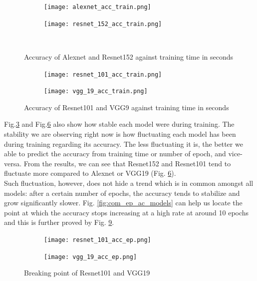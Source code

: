\begin{figure}[h]
     \begin{subfigure}{0.5\textwidth}
	    \texttt{[image: alexnet\_acc\_train.png]}
         \label{fig:alexnet_acc_train}
     \end{subfigure}
     \hfill
     \begin{subfigure}{0.5\textwidth}
	    \texttt{[image: resnet\_152\_acc\_train.png]}
        \label{fig:resnet_152_acc_train}
     \end{subfigure}\\
     \caption{Accuracy of Alexnet and Resnet152 against training time in seconds}
        \label{fig:sing_acc_train2}
\end{figure}
\begin{figure}[h]
     \begin{subfigure}{0.5\textwidth}
	    \texttt{[image: resnet\_101\_acc\_train.png]}
        \label{fig:resnet_1o1_acc_train}
     \end{subfigure}
     \begin{subfigure}{0.5\textwidth}
	    \texttt{[image: vgg\_19\_acc\_train.png]}
        \label{fig:vgg_19_acc_train}
     \end{subfigure}
        \caption{Accuracy of Resnet101 and VGG9 against training time in seconds}
        \label{fig:sing_acc_train}
\end{figure}
Fig.\ref{fig:sing_acc_train2} and Fig.\ref{fig:sing_acc_train} also show how stable each model were during training. The stability we are observing right now is how fluctuating each model has been during training regarding its accuracy. The less fluctuating it is, the better we able to predict the accuracy from training time or number of epoch, and vice-versa. From the results, we can see that Resnet152 and Resnet101 tend to fluctuate more compared to Alexnet or VGG19 (Fig. \ref{fig:sing_acc_train}). \\
Such fluctuation, however, does not hide a trend which is in common amongst all models: after a certain number of epochs, the accuracy tends to stabilize and grow significantly slower. Fig. \ref{fig:com_ep_ac_models} can help us locate the point at which the accuracy stops increasing at a high rate at around 10 epochs and this is further proved by Fig. \ref{fig:sing_acc_ep}.\\
\begin{figure}[h]
     \begin{subfigure}{0.5\textwidth}
	    \texttt{[image: resnet\_101\_acc\_ep.png]}
        \label{fig:resnet_101_acc_ep}
     \end{subfigure}
     \begin{subfigure}{0.5\textwidth}
	    \texttt{[image: vgg\_19\_acc\_ep.png]}
        \label{fig:vgg_19_acc_ep}
     \end{subfigure}
        \caption{Breaking point of Resnet101 and VGG19}
        \label{fig:sing_acc_ep}
\end{figure}\\



